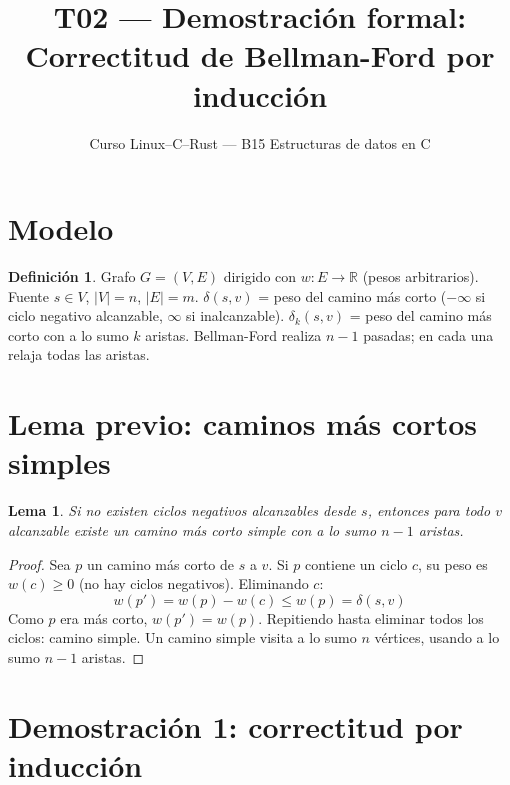 \documentclass[11pt, letterpaper]{article}
\title{%
  T02 --- Demostración formal:\\[4pt]
  Correctitud de Bellman-Ford por inducción
}
\author{Curso Linux--C--Rust --- B15 Estructuras de datos en C}
\date{}
\theoremstyle{definition}
\newtheorem{definition}{Definición}[section]
\theoremstyle{plain}
\newtheorem{lemma}[theorem]{Lema}
\theoremstyle{remark}
\begin{document}
\maketitle
\tableofcontents

\section{Modelo}

\begin{definition}
Grafo $G = (V, E)$ dirigido con $w: E \to \mathbb{R}$ (pesos
arbitrarios). Fuente $s \in V$, $|V| = n$, $|E| = m$.
$\delta(s,v)$ = peso del camino más corto ($-\infty$ si ciclo
negativo alcanzable, $\infty$ si inalcanzable).
$\delta_k(s,v)$ = peso del camino más corto con a lo sumo $k$
aristas. Bellman-Ford realiza $n - 1$ pasadas; en cada una relaja
todas las aristas.
\end{definition}

\section{Lema previo: caminos más cortos simples}

\begin{lemma}\label{lem:simple}
Si no existen ciclos negativos alcanzables desde $s$, entonces para
todo $v$ alcanzable existe un camino más corto simple con a lo sumo
$n - 1$ aristas.
\end{lemma}

\begin{proof}
Sea $p$ un camino más corto de $s$ a $v$. Si $p$ contiene un ciclo
$c$, su peso es $w(c) \geq 0$ (no hay ciclos negativos). Eliminando
$c$:
\[
  w(p') = w(p) - w(c) \leq w(p) = \delta(s,v)
\]
Como $p$ era más corto, $w(p') = w(p)$. Repitiendo hasta eliminar
todos los ciclos: camino simple. Un camino simple visita a lo sumo
$n$ vértices, usando a lo sumo $n - 1$ aristas.
\end{proof}

\section{Demostración 1: correctitud por inducción}
\end{document}
